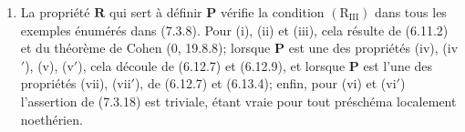 \begin{remarks}[7.3.19]
\label{IV.2.s7.3.19-fr}
\begin{enumerate}
\item[\emph{i)}] La propriété $\boldsymbol R$ qui sert à définir $\boldsymbol P$
vérifie la condition $(\mathrm R_{\mathrm{III}})$ dans tous les exemples
énumérés dans (7.3.8). Pour (i), (ii) et (iii), cela résulte de (6.11.2)
et du théorème de Cohen (0, 19.8.8); lorsque $\boldsymbol P$ est une des
propriétés (iv), (iv$'$), (v), (v$'$), cela découle de (6.12.7) et
(6.12.9), et lorsque $\boldsymbol P$ est l'une des propriétés (vii),
(vii$'$), de (6.12.7) et (6.13.4); enfin, pour (vi) et (vi$'$)
l'assertion de (7.3.18) est triviale, étant vraie pour tout préschéma
localement noethérien.



\end{enumerate}
\end{remarks}
